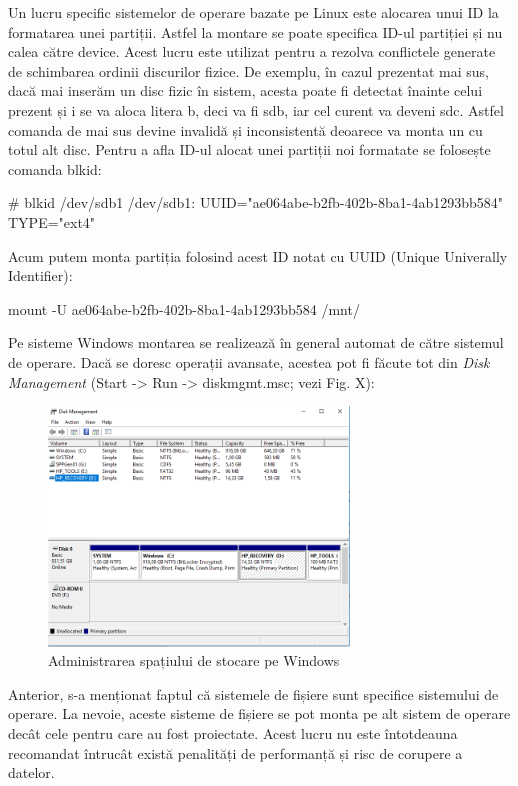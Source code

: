 Un lucru specific sistemelor de operare bazate pe Linux este alocarea unui ID
la formatarea unei partiții. Astfel la montare se poate specifica ID-ul
partiției și nu calea către device. Acest lucru este utilizat pentru a rezolva
conflictele generate de schimbarea ordinii discurilor fizice. De exemplu, în
cazul prezentat mai sus, dacă mai inserăm un disc fizic în sistem, acesta poate
fi detectat înainte celui prezent și i se va aloca litera b, deci va fi sdb, iar
cel curent va deveni sdc. Astfel comanda de mai sus devine invalidă și
inconsistentă deoarece va monta un cu totul alt disc. Pentru a afla ID-ul alocat
unei partiții noi formatate se folosește comanda blkid:

\begin{screen}
# blkid /dev/sdb1
/dev/sdb1: UUID="ae064abe-b2fb-402b-8ba1-4ab1293bb584" TYPE="ext4"
\end{screen}

Acum putem monta partiția folosind acest ID notat cu UUID (Unique Univerally
Identifier):

\begin{screen}
mount -U ae064abe-b2fb-402b-8ba1-4ab1293bb584 /mnt/
\end{screen}


Pe sisteme Windows montarea se realizează în general automat de către sistemul
de operare. Dacă se doresc operații avansate, acestea pot fi făcute tot din
\textit{Disk Management} (Start -> Run -> diskmgmt.msc; vezi Fig. X):

\begin{figure}[!htbp]
	\centering
	\includegraphics[width=8cm]{chapters/10-storage/img/admin-img.png}
	\caption{Administrarea spațiului de stocare pe Windows}
	\label{fig:storage-admin}
\end{figure}

Anterior, s-a menționat faptul că sistemele de fișiere sunt specifice sistemului
de operare. La nevoie, aceste sisteme de fișiere se pot monta pe alt sistem de
operare decât cele pentru care au fost proiectate. Acest lucru nu este
întotdeauna recomandat întrucât există penalități de performanță și risc de
corupere a datelor.

